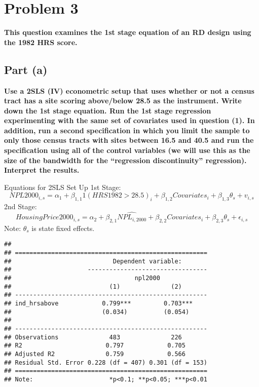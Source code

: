 \documentclass[
]{article}
\begin{document}
\newpage

\hypertarget{problem-3}{%
\section{Problem 3}\label{problem-3}}

\textbf{This question examines the 1st stage equation of an RD design
using the 1982 HRS score.}

\hypertarget{part-a-2}{%
\subsection{Part (a)}\label{part-a-2}}

\textbf{Use a 2SLS (IV) econometric setup that uses whether or not a
census tract has a site scoring above/below 28.5 as the instrument.
Write down the 1st stage equation. Run the 1st stage regression
experimenting with the same set of covariates used in question (1). In
addition, run a second specification in which you limit the sample to
only those census tracts with sites between 16.5 and 40.5 and run the
specification using all of the control variables (we will use this as
the size of the bandwidth for the ``regression discontinuity''
regression). Interpret the results.}

Equations for 2SLS Set Up 1st Stage: \[
NPL2000_{i,s} = \alpha_1 + \beta_{1,1} 1(HRS1982 > 28.5)_i + \beta_{1,2} Covariates_{i} + \beta_{1,3} \theta_s + v_{i,s} 
\] 2nd Stage: \[
HousingPrice2000_{i,s} = \alpha_2 + \beta_{2,1} \hat{NPL_{i,2000}} + \beta_{2,2} Covariates_{i} + \beta_{2,3} \theta_s + \epsilon_{i,s}
\] Note: \(\theta_s\) is state fixed effects.

\begin{verbatim}
## 
## =====================================================
##                            Dependent variable:       
##                     ---------------------------------
##                                  npl2000             
##                           (1)              (2)       
## -----------------------------------------------------
## ind_hrsabove            0.799***         0.703***    
##                         (0.034)          (0.054)     
##                                                      
## -----------------------------------------------------
## Observations              483              226       
## R2                       0.797            0.705      
## Adjusted R2              0.759            0.566      
## Residual Std. Error 0.228 (df = 407) 0.301 (df = 153)
## =====================================================
## Note:                     *p<0.1; **p<0.05; ***p<0.01
\end{verbatim}
\end{document}
